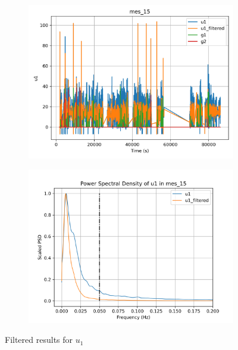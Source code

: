 \begin{figure}[H]

\begin{minipage}{0.49\textwidth}
        \begin{figure}[H]
                \centering
                \includegraphics[width = \textwidth]{./figs/trk_filt/mes_15/u1.png}
        \end{figure}
\end{minipage}
\begin{minipage}{0.49\textwidth}
        \begin{figure}[H]
                \centering
                \includegraphics[width = \textwidth]{./figs/trk_filt/mes_15/u1_psd.png}
        \end{figure}
\end{minipage}
\caption{Filtered results for $u_1$}

\end{figure}


